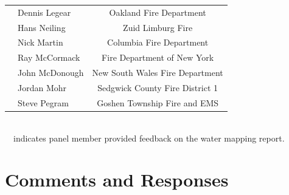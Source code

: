 \documentclass[12pt,oneside]{book}
\begin{document}
\begin{table}[!ht]
\begin{tabular}{llc}
		\checkmark & Dennis Legear    & Oakland Fire Department \\ 
		\checkmark & Hans Neiling     & Zuid Limburg Fire \\ 
		& Nick Martin      & Columbia Fire Department \\ 
		& Ray McCormack    & Fire Department of New York \\ 
		& John McDonough   & New South Wales Fire Department \\ 
		\checkmark & Jordan Mohr      & Sedgwick County Fire District 1 \\ 
		& Steve Pegram     & Goshen Township Fire and EMS \\ 
		\bottomrule[1.25pt]
	\end{tabular}
	\\ \checkmark~~indicates panel member provided feedback on the water mapping report.
\end{table}

\newpage

\chapter*{Comments and Responses}
\label{comments}
\end{document}
